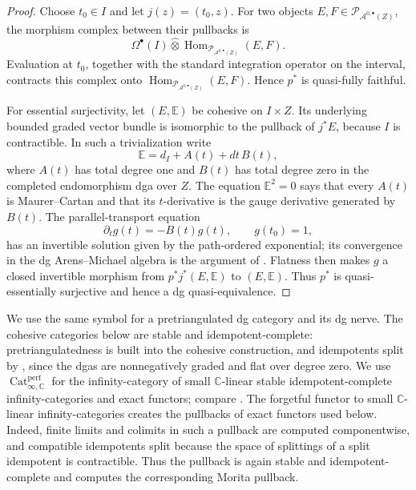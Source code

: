 \documentclass[12pt]{amsart}
\theoremstyle{definition}
\theoremstyle{remark}
\numberwithin{equation}{section}
\newcommand{\CA}{\mathcal A}
\newcommand{\C}{\mathbb C}
\begin{document}
\begin{proof}
Choose \(t_0\in I\) and let \(j(z)=(t_0,z)\).  For two objects
\(E,F\in\mathcal P_{\CA^{0,\bullet}(Z)}\), the morphism complex between
their pullbacks is
\[
\Omega^\bullet(I)\widehat\otimes
\operatorname{Hom}_{\mathcal P_{\CA^{0,\bullet}(Z)}}(E,F).
\]
Evaluation at \(t_0\), together with the standard integration operator on
the interval, contracts this complex onto
\(\operatorname{Hom}_{\mathcal P_{\CA^{0,\bullet}(Z)}}(E,F)\).
Hence \(p^*\) is
quasi-fully faithful.

For essential surjectivity, let \((E,\mathbb E)\) be cohesive on
\(I\times Z\).  Its underlying bounded graded vector bundle is isomorphic
to the pullback of \(j^*E\), because \(I\) is contractible.  In such a
trivialization write
\[
\mathbb E=d_I+A(t)+dt\,B(t),
\]
where \(A(t)\) has total degree one and \(B(t)\) has total degree zero in
the completed endomorphism dga over \(Z\).  The equation
\(\mathbb E^2=0\) says that every \(A(t)\) is Maurer--Cartan and that its
\(t\)-derivative is the gauge derivative generated by \(B(t)\).  The
parallel-transport equation
\[
\partial_tg(t)=-B(t)g(t),
\qquad
g(t_0)=1,
\]
has an invertible solution given by the path-ordered exponential; its
convergence in the dg Arens--Michael algebra is the argument of
\cite[Theorem~4.4]{CHL2021}.  Flatness then makes \(g\) a closed invertible
morphism from \(p^*j^*(E,\mathbb E)\) to \((E,\mathbb E)\).  Thus \(p^*\)
is quasi-essentially surjective and hence a dg quasi-equivalence.
\end{proof}

We use the same symbol for a pretriangulated dg category and its dg nerve.
The cohesive categories below are stable and idempotent-complete:
pretriangulatedness is built into the cohesive construction, and
idempotents split by \cite[Lemma~3.3]{CHL2021}, since the dgas are
nonnegatively graded and flat over degree zero.  We use
\(\operatorname{Cat}^{\mathrm{perf}}_{\infty,\C}\) for the infinity-category
of small \(\C\)-linear stable idempotent-complete infinity-categories and
exact functors; compare \cite[Section~3]{BlumbergGepnerTabuada2013}.  The
forgetful functor to small \(\C\)-linear infinity-categories creates the
pullbacks of exact functors used below.  Indeed, finite limits and colimits
in such a pullback are computed componentwise, and compatible idempotents
split because the space of splittings of a split idempotent is contractible.
Thus the pullback is again stable and idempotent-complete and computes the
corresponding Morita pullback.
\end{document}
